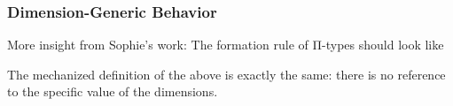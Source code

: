 \begin{frame}
  \frametitle{Dimension-Generic Behavior}

  \pause More insight from Sophie's work: The formation rule of Π-types should
  look like
  \begin{tightcenter}
    \begin{prooftree}
    \end{prooftree}
  \end{tightcenter}

  \pause The mechanized definition of the above is exactly the same:
  there is no reference to the specific value of the dimensions.

  \begin{tightcenter}
    \begin{prooftree}
    \end{prooftree}
  \end{tightcenter}
\end{frame}

